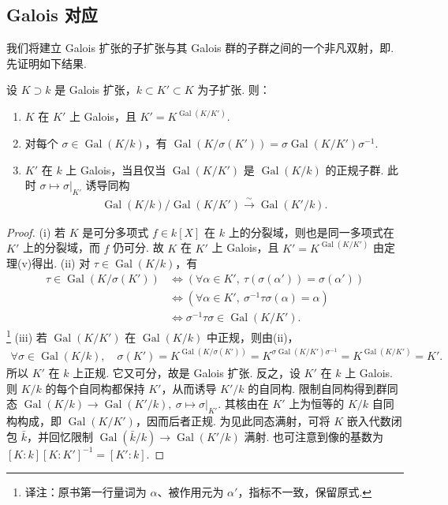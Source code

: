 \subsection{Galois 对应}\label{sec:galois-2-7-7}
我们将建立 Galois 扩张的子扩张与其 Galois 群的子群之间的一个非凡双射，即. 先证明如下结果.
\begin{proposition*}设 $K\supset k$ 是 Galois 扩张，$k\subset K'\subset K$ 为子扩张. 则：
\begin{enumerate}[label=\roman*)]
\item $K$ 在 $K'$ 上 Galois，且 $K'=K^{\operatorname{Gal}(K/K')}$.
\item 对每个 $\sigma\in\operatorname{Gal}(K/k)$，有 $\operatorname{Gal}(K/\sigma(K'))=\sigma\operatorname{Gal}(K/K')\sigma^{-1}$.
\item $K'$ 在 $k$ 上 Galois，当且仅当 $\operatorname{Gal}(K/K')$ 是 $\operatorname{Gal}(K/k)$ 的正规子群. 此时 $\sigma\mapsto\sigma|_{K'}$ 诱导同构
\begin{align*}\operatorname{Gal}(K/k)/\operatorname{Gal}(K/K')\xrightarrow{\sim}\operatorname{Gal}(K'/k).\end{align*}
\end{enumerate}\end{proposition*}
\begin{proof}(i) 若 $K$ 是可分多项式 $f\in k[X]$ 在 $k$ 上的分裂域，则也是同一多项式在 $K'$ 上的分裂域，而 $f$ 仍可分. 故 $K$ 在 $K'$ 上 Galois，且 $K'=K^{\operatorname{Gal}(K/K')}$ 由定理(v)得出.
(ii) 对 $\tau\in\operatorname{Gal}(K/k)$，有
\begin{align*}
\tau\in\operatorname{Gal}(K/\sigma(K'))&\Longleftrightarrow(\forall\alpha\in K',\ \tau(\sigma(\alpha'))=\sigma(\alpha'))\\
&\Longleftrightarrow(\forall\alpha\in K',\ \sigma^{-1}\tau\sigma(\alpha)=\alpha)\\
&\Longleftrightarrow\sigma^{-1}\tau\sigma\in\operatorname{Gal}(K/K').
\end{align*}
\footnote{译注：原书第一行量词为 $\alpha$、被作用元为 $\alpha'$，指标不一致，保留原式.}
(iii) 若 $\operatorname{Gal}(K/K')$ 在 $\operatorname{Gal}(K/k)$ 中正规，则由(ii)，
\begin{align*}
\forall\sigma\in\operatorname{Gal}(K/k),\quad\sigma(K')=K^{\operatorname{Gal}(K/\sigma(K'))}=K^{\sigma\operatorname{Gal}(K/K')\sigma^{-1}}=K^{\operatorname{Gal}(K/K')}=K'.
\end{align*}
所以 $K'$ 在 $k$ 上正规. 它又可分，故是 Galois 扩张. 反之，设 $K'$ 在 $k$ 上 Galois. 则 $K/k$ 的每个自同构都保持 $K'$，从而诱导 $K'/k$ 的自同构. 限制自同构得到群同态 $\operatorname{Gal}(K/k)\to\operatorname{Gal}(K'/k),\ \sigma\mapsto\sigma|_{K'}$. 其核由在 $K'$ 上为恒等的 $K/k$ 自同构构成，即 $\operatorname{Gal}(K/K')$，因而后者正规. 为见此同态满射，可将 $K$ 嵌入代数闭包 $\bar k$，并回忆限制 $\operatorname{Gal}(\bar k/k)\to\operatorname{Gal}(K'/k)$ 满射. 也可注意到像的基数为 $[K:k][K:K']^{-1}=[K':k]$.
\end{proof}
